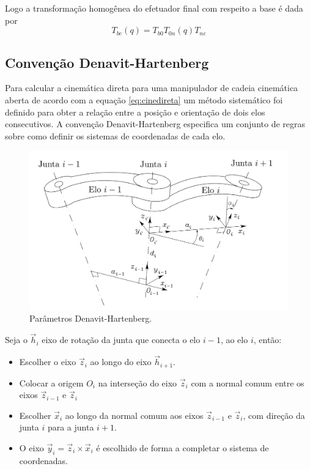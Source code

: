 Logo a transformação homogênea do efetuador final com respeito a base é dada por
\begin{equation} \label{eq:base_efetuador}
{T}_{be}({q}) = {T}_{b0} {T}_{0n}({q}) {T}_{ne} 
\end{equation}

\subsection{Convenção Denavit-Hartenberg} \label{sec:denavit}
Para calcular a cinemática direta para uma manipulador de cadeia cinemática aberta de acordo com a equação \eqref{eq:cinedireta} um método sistemático foi definido para obter a relação entre a posição e orientação de dois elos consecutivos. A convenção Denavit-Hartenberg especifica um conjunto de regras sobre como definir os sistemas de coordenadas de cada elo.

\begin{figure}[!h]
  \centering
  \includegraphics[width=0.8\linewidth]{./img/dh_pt.png}
  \caption{Parâmetros Denavit-Hartenberg.}
  \label{fig:dh_pt}
\end{figure}

Seja o $\vec{h}_i$ eixo de rotação da junta que conecta o elo $i-1$, ao elo $i$, então:

\begin{itemize}
\item Escolher o eixo $\vec{z}_i$ ao longo do eixo $\vec{h}_{i+1}$.
\item Colocar a origem $O_i$ na interseção do eixo $\vec{z}_i$ com a normal comum entre os eixos $\vec{z}_{i-1}$ e $\vec{z}_i$
\item Escolher $\vec{x}_i$ ao longo da normal comum aos eixos $\vec{z}_{i-1}$ e $\vec{z}_i$, com direção da junta $i$ para a junta $i+1$. 
\item O eixo $\vec{y}_i = \vec{z}_i \times \vec{x}_i$ é escolhido de forma a completar o sistema de coordenadas.
\end{itemize}

